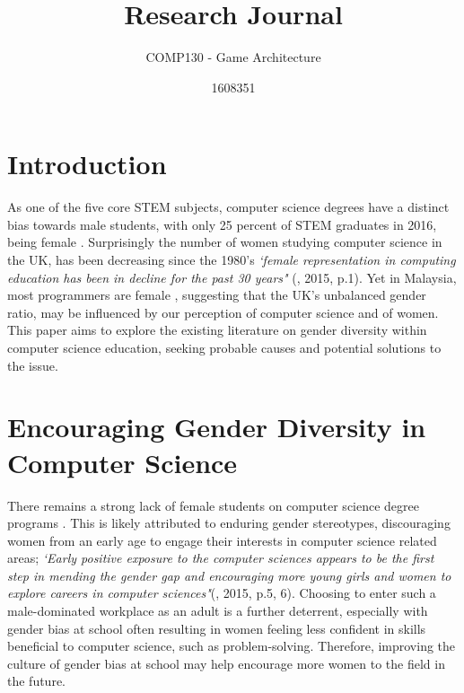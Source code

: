\documentclass{scrartcl}
\title{Research Journal}
\subtitle{COMP130 - Game Architecture}
\author{1608351}
\begin{document}
\maketitle

\section{Introduction}

As one of the five core STEM subjects, computer science degrees have a distinct bias towards male students, with only 25 percent of STEM graduates in 2016, being female \cite{12}. Surprisingly the number of women studying computer science in the UK, has been decreasing since the 1980's \textit{`female representation in computing education has been in decline for the past 30 years"} (\cite{gender}, 2015, p.1). Yet in Malaysia, most programmers are female \cite{8}, suggesting that the UK's unbalanced gender ratio, may be influenced by our perception of computer science and of women. This paper aims to explore the existing literature on gender diversity within computer science education, seeking probable causes and potential solutions to the issue.

\section{Encouraging Gender Diversity in Computer Science}

There remains a strong lack of female students on computer science degree programs \cite{3}. This is likely attributed to enduring gender stereotypes, discouraging women from an early age to engage their interests in computer science related areas; \textit{`Early positive exposure to the computer sciences appears to be the first step in mending the gender gap and encouraging more young girls and women to explore careers in computer sciences"}(\cite{3}, 2015, p.5, 6). Choosing to enter such a male-dominated workplace as an adult is a further deterrent, especially with gender bias at school often resulting in women feeling less confident in skills beneficial to computer science, such as problem-solving. Therefore, improving the culture of gender bias at school may help encourage more women to the field in the future. 
\end{document}
